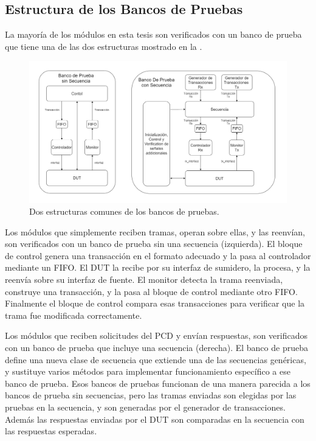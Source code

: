 \documentclass[a4paper, twoside, 11pt]{report}
\begin{document}
\FloatBarrier
\subsection{Estructura de los Bancos de Pruebas}

La mayoría de los módulos en esta tesis son verificados con un banco de prueba que tiene una de las dos estructuras mostrado en la .

\begin{figure}[htb]
  \centering
  \includegraphics[width=1.0\textwidth]{./img/verification3}
  \caption{Dos estructuras comunes de los bancos de pruebas.}
  \label{fig:tb_structures}
\end{figure}

Los módulos que simplemente reciben tramas, operan sobre ellas, y las reenvían, son verificados con un banco de prueba sin una secuencia (izquierda). El bloque de control genera una transacción en el formato adecuado y la pasa al controlador mediante un FIFO. El DUT la recibe por su interfaz de sumidero, la procesa, y la reenvía sobre su interfaz de fuente. El monitor detecta la trama reenviada, construye una transacción, y la pasa al bloque de control mediante otro FIFO. Finalmente el bloque de control compara esas transacciones para verificar que la trama fue modificada correctamente.

Los módulos que reciben solicitudes del PCD y envían respuestas, son verificados con un banco de prueba que incluye una secuencia (derecha). El banco de prueba define una nueva clase de secuencia que extiende una de las secuencias genéricas, y sustituye varios métodos para implementar funcionamiento específico a ese banco de prueba. Esos bancos de pruebas funcionan de una manera parecida a los bancos de prueba sin secuencias, pero las tramas enviadas son elegidas por las pruebas en la secuencia, y son generadas por el generador de transacciones. Además las respuestas enviadas por el DUT son comparadas en la secuencia con las respuestas esperadas.
\end{document}
